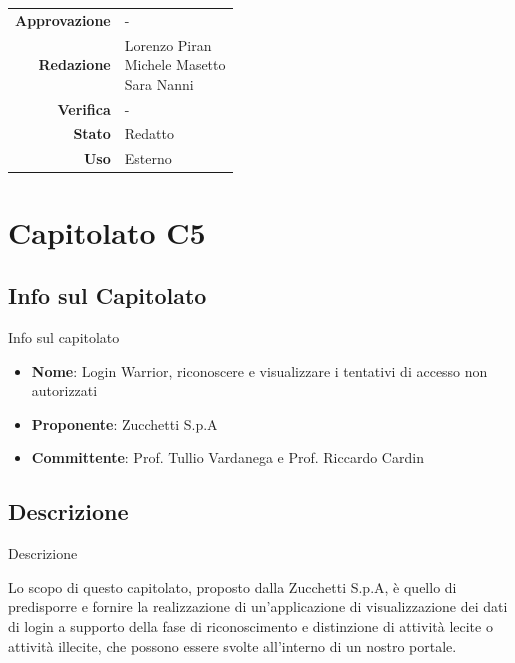 \documentclass[11pt]{article}
\begin{document}
\begin{titlepage}
\begin{center}
			\large
			
			
			\vfill
			
			\begin{tabular}{r|l}
				\textbf{Approvazione} &  -\\
				\textbf{Redazione} &  \parbox[t]{3.5cm}{Lorenzo Piran \\Michele Masetto \\ Sara Nanni}\\
				\textbf{Verifica} &  -\\
				\textbf{Stato} & Redatto \\
				\textbf{Uso} & Esterno
			\end{tabular}
			\vfill
			
		\end{center}
	\end{titlepage}

\maketitle

\tableofcontents
\newpage

\section{Capitolato C5}
    \subsection{Info sul Capitolato} Info sul capitolato
    \begin{itemize}
        \item \textbf{Nome}: Login Warrior, riconoscere e visualizzare i tentativi di accesso non autorizzati
        \item \textbf{Proponente}: Zucchetti S.p.A
        \item \textbf{Committente}: Prof. Tullio Vardanega e Prof. Riccardo Cardin
    \end{itemize}
    \subsection{Descrizione} Descrizione
    
    Lo scopo di questo capitolato, proposto dalla Zucchetti S.p.A, è quello di predisporre e fornire la realizzazione di un'applicazione di visualizzazione dei dati di login a supporto della fase di riconoscimento e distinzione di attività lecite o attività illecite, che possono essere svolte all'interno di un nostro portale.
    
\end{document}
